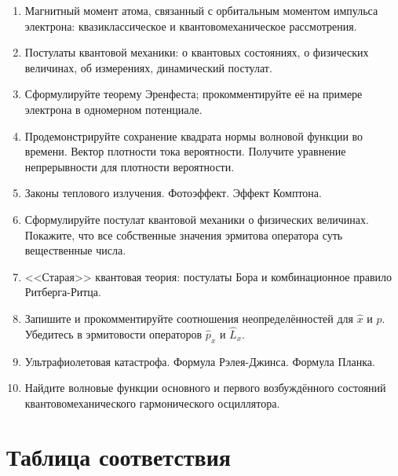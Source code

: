 \documentclass[12pt]{article}
\newcommand{\kL}[1]{\label{К-#1}}
\def\twodigits#1{%
\ifnum#1<10 0\fi 
\number#1}
\begin{document}
\begin{enumerate}[label={\textbf{К-\protect\twodigits{\theenumi}}}]
\item\kL{24}
Магнитный момент атома, связанный с орбитальным моментом импульса электрона: квазиклассическое и квантовомеханическое рассмотрения.

\item\kL{25}
Постулаты квантовой механики: о квантовых состояниях, о физических величинах, об измерениях, динамический постулат.

\item\kL{26}
Сформулируйте теорему Эренфеста; прокомментируйте её на примере электрона в одномерном потенциале.

\item\kL{27}
Продемонстрируйте сохранение квадрата нормы волновой функции во времени. Вектор плотности тока вероятности. Получите уравнение непрерывности для плотности вероятности.

\item\kL{28}
Законы теплового излучения. Фотоэффект. Эффект Комптона.

\item\kL{29}
Сформулируйте постулат квантовой механики о физических величинах. Покажите, что все собственные значения эрмитова оператора суть вещественные числа.

\item\kL{30}
<<Старая>> квантовая теория: постулаты Бора и комбинационное правило Ритберга-Ритца.

\item\kL{31}
Запишите и прокомментируйте соотношения неопределённостей для $\hat{x}$ и $\hat{p}$. Убедитесь в эрмитовости операторов $\hat{p}_x$ и $\hat{L}_x$.

\item\kL{32}
Ультрафиолетовая катастрофа. Формула Рэлея-Джинса. Формула Планка.

\item\kL{33}
Найдите волновые функции основного и первого возбуждённого состояний квантовомеханического гармонического осциллятора.


\end{enumerate}

\clearpage

%
\section*{Таблица соответствия}
%
\end{document}
